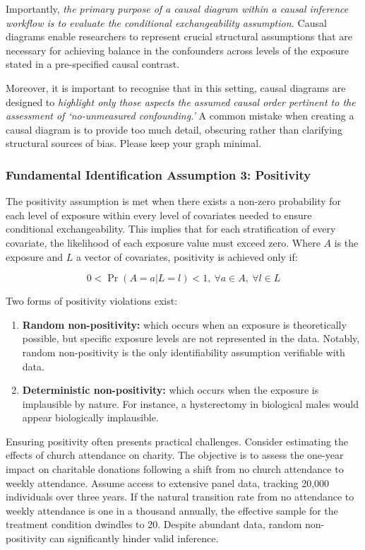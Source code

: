 \documentclass[
  singlecolumn,
  9pt]{article}
\begin{document}
Importantly, \emph{the primary purpose of a causal diagram within a
causal inference workflow is to evaluate the conditional exchangeability
assumption.} Causal diagrams enable researchers to represent crucial
structural assumptions that are necessary for achieving balance in the
confounders across levels of the exposure stated in a pre-specified
causal contrast.

Moreover, it is important to recognise that in this setting, causal
diagrams are designed to \emph{highlight only those aspects the assumed
causal order pertinent to the assessment of `no-unmeasured
confounding.'} A common mistake when creating a causal diagram is to
provide too much detail, obscuring rather than clarifying structural
sources of bias. Please keep your graph minimal.

\subsubsection{Fundamental Identification Assumption 3:
Positivity}\label{fundamental-identification-assumption-3-positivity}

The positivity assumption is met when there exists a non-zero
probability for each level of exposure within every level of covariates
needed to ensure conditional exchangeability. This implies that for each
stratification of every covariate, the likelihood of each exposure value
must exceed zero. Where \(A\) is the exposure and \(L\) a vector of
covariates, positivity is achieved only if:

\[
0 < \Pr(A = a | L = l) < 1, ~ \forall a \in A, ~ \forall l \in L
\]

Two forms of positivity violations exist:

\begin{enumerate}
\def\labelenumi{\arabic{enumi}.}
\item
  \textbf{Random non-positivity:} which occurs when an exposure is
  theoretically possible, but specific exposure levels are not
  represented in the data. Notably, random non-positivity is the only
  identifiability assumption verifiable with data.
\item
  \textbf{Deterministic non-positivity:} which occurs when the exposure
  is implausible by nature. For instance, a hysterectomy in biological
  males would appear biologically implausible.
\end{enumerate}

Ensuring positivity often presents practical challenges. Consider
estimating the effects of church attendance on charity. The objective is
to assess the one-year impact on charitable donations following a shift
from no church attendance to weekly attendance. Assume access to
extensive panel data, tracking 20,000 individuals over three years. If
the natural transition rate from no attendance to weekly attendance is
one in a thousand annually, the effective sample for the treatment
condition dwindles to 20. Despite abundant data, random non-positivity
can significantly hinder valid inference.
\end{document}
